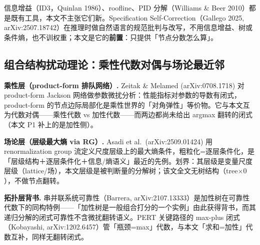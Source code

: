 \documentclass[12pt]{ctexart}
\begin{document}
信息增益（ID3，Quinlan 1986）、roofline、PID 分解（Williams \& Beer 2010）都是既有工具，本文不主张它们新。Specification Self-Correction（Gallego 2025, arXiv:2507.18742）在推理时做自然语言的规范批判与改写，不用信息增益、树或条件熵，也不训权重；本文是它的\textbf{前置}：只提供「节点分数怎么算」。

\begin{table}[htbp]
\centering\small
{}
\end{table}

\subsection{组合结构扰动理论：乘性代数对偶与场论最近邻}
\label{sec:combo}

\textbf{乘性层（product-form 排队网络）.} Zeitak \& Melamed (arXiv:0708.1718) 对 product-form Jackson 网络做参数微扰分析：性能指标对参数的导数有闭式，product-form 的节点边际局部化是乘性世界的「对角弹性」等价物。它与本文互为代数对偶——乘性代数 vs 加性代数——而两边都尚未给出 argmax 翻转的闭式（本文 P1 补上的是加性侧）。

\textbf{场论层（层级最大熵 via RG）.} Asadi et al.\ (arXiv:2509.01424) 用 renormalization group 流定义尺度层级上的最大熵条件，粗粒化=逐层条件化，是「层级结构＋逐层条件化＋信息/熵语义」最近的先例。划界：其层级是变量尺度层级（lattice/场），本文层级是被判断量的分解树；该文全文无树结构（tree$\times 0$），不做节点翻转。

\textbf{拓扑层背书.} 串并联系统可靠性（Barrera, arXiv:2107.13333）是加性树在可靠性代数下的同构特例——「加性树是一般组合打分的一个实例」由此获得背书，而其递归分解的闭式可靠性不含微扰翻转语义。PERT 关键路径的 max-plus 闭式（Kobayashi, arXiv:1202.6457）管「瓶颈=max」代数，与本文「求和=加性」代数互补，同样无翻转闭式。
\end{document}
